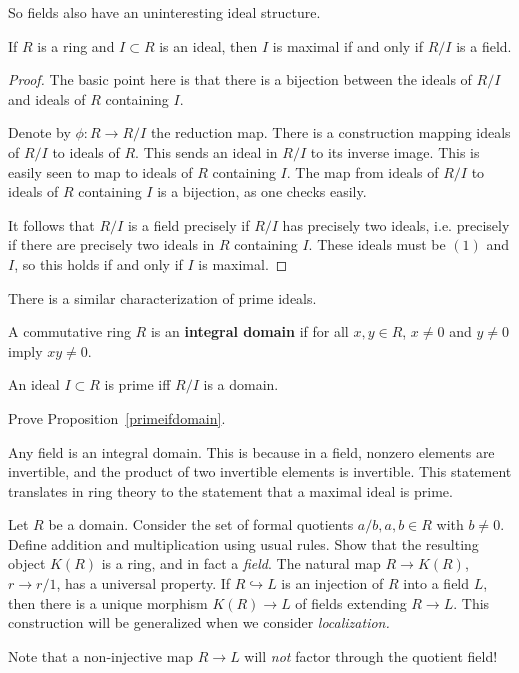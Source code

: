 So fields also have an uninteresting ideal structure.

\begin{corollary} 
If $R$ is a ring and $I \subset R$ is an ideal, then $I$ is maximal if and only
if $R/I$ is a field.
\end{corollary} 

\begin{proof}
The basic point here is that there is a bijection between the ideals of $R/I$
and ideals of $R$ containing $I$. 

Denote  by $\phi: R \to R/I$ the reduction map. There is a
construction mapping ideals of $R/I$ to ideals of $R$. This sends an ideal in
$R/I$ to
its inverse image.  This is easily seen to map to ideals of $R$ containing $I$.
The map from ideals of $R/I$ to ideals of $R$ containing $I$ is a bijection,
as one checks easily.

It follows that $R/I$ is a field precisely if
$R/I$ has precisely two ideals, i.e. precisely if there are precisely two
ideals in $R$ containing $I$. These ideals must be $(1)$ and $I$, so this
holds if and only if $I$ is maximal.
\end{proof} 

There is a similar characterization of prime ideals.

\begin{definition} 
A commutative ring $R$ is an \textbf{integral domain} if for all $ x,y \in R$,
$x \neq 0 $ and $y \neq 0$ imply $xy \neq 0$.
\end{definition} 

\begin{proposition}\label{primeifdomain} 
An ideal $I \subset R$ is prime iff $R/I$ is a domain.
\end{proposition} 

\begin{exercise} 
Prove Proposition~\ref{primeifdomain}.
\end{exercise} 

Any field is an integral domain. This is because in a field, nonzero elements
are invertible, and the product of two invertible elements is invertible. This
statement translates in ring theory to the statement that a maximal ideal is
prime.

\begin{exercise} 
Let $R$ be a domain. Consider the set of formal quotients $a/b, a, b \in R$
with $b \neq 0$. Define addition and multiplication using usual rules. Show
that the resulting object $K(R)$ is a ring, and in fact a \emph{field}. The
natural map $R \to K(R)$, $r \to r/1$, has a universal property. If $R
\hookrightarrow L$ is an injection of $R$ into a field $L$, then there is a
unique morphism $K(R) \to L$ of fields extending $R \to L$. This construction
will be generalized when we consider \emph{localization.}

Note that a non-injective map $R\to L$ will \emph{not} factor through the
quotient field!
\end{exercise} 


